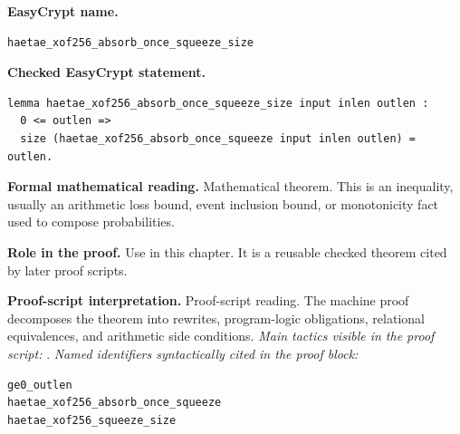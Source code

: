 \begin{formaltheorem}
\noindent\textbf{EasyCrypt name.}
\begin{lstlisting}[language=EasyCrypt,basicstyle=\ttfamily\scriptsize]
haetae_xof256_absorb_once_squeeze_size
\end{lstlisting}
\noindent\textbf{Checked EasyCrypt statement.}
\begin{lstlisting}[language=EasyCrypt,basicstyle=\ttfamily\scriptsize]
lemma haetae_xof256_absorb_once_squeeze_size input inlen outlen :
  0 <= outlen =>
  size (haetae_xof256_absorb_once_squeeze input inlen outlen) = outlen.
\end{lstlisting}
\noindent\textbf{Formal mathematical reading.}
Mathematical theorem. This is an inequality, usually an arithmetic loss bound, event inclusion bound, or monotonicity fact used to compose probabilities.

\noindent\textbf{Role in the proof.}
Use in this chapter. It is a reusable checked theorem cited by later proof scripts.

\noindent\textbf{Proof-script interpretation.}
Proof-script reading. The machine proof decomposes the theorem into rewrites, program-logic obligations, relational equivalences, and arithmetic side conditions.
\emph{Main tactics visible in the proof script:} .
\emph{Named identifiers syntactically cited in the proof block:}
\begin{lstlisting}[language=EasyCrypt,basicstyle=\ttfamily\scriptsize]
ge0_outlen
haetae_xof256_absorb_once_squeeze
haetae_xof256_squeeze_size
\end{lstlisting}

\end{formaltheorem}

